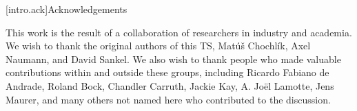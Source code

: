 [intro.ack]{Acknowledgements}

\pnum
This work is the result of a collaboration of researchers in industry and
academia.  We wish to thank the original authors of this TS, Mat\'{u}\v{s}
Chochl\'{i}k, Axel Naumann, and David Sankel. We also wish to thank people who
made valuable contributions within and outside these groups, including Ricardo
Fabiano de Andrade, Roland Bock, Chandler Carruth, Jackie Kay, A. Joël Lamotte,
Jens Maurer, and many others not named here who contributed to the discussion.
